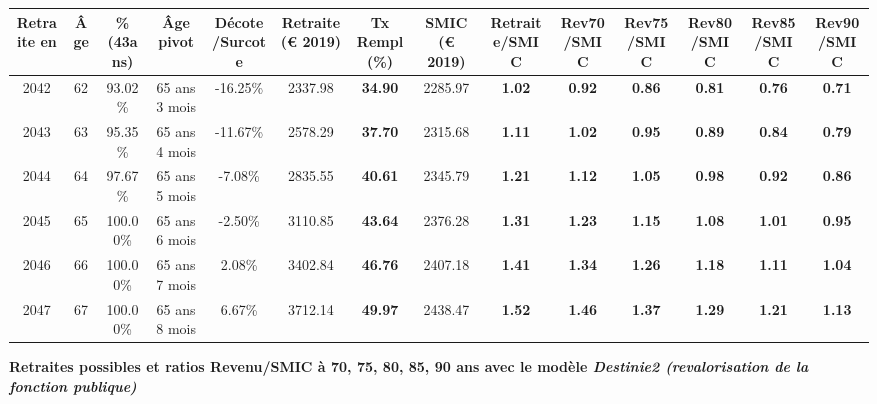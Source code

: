 \begin{adjustbox}{max width=\textwidth} 
\begin{tabular}[htb]{|c|c||c|c|c||c|c||c||c|c|c|c|c|c|} 
\hline 
 Retraite en &  Âge &  \%(43ans) &  Âge pivot &  Décote/Surcote &  Retraite (\euro{} 2019) &  Tx Rempl(\%) &  SMIC (\euro{} 2019) &  Retraite/SMIC &  Rev70/SMIC &  Rev75/SMIC &  Rev80/SMIC &  Rev85/SMIC &  Rev90/SMIC \\ 
\hline \hline 
 2042 &  62 &  93.02\% &  65 ans 3 mois &  -16.25\% &  2337.98 &  {\bf 34.90} &  2285.97 &  {\bf 1.02} &  {\bf {\color{red} 0.92}} &  {\bf {\color{red} 0.86}} &  {\bf {\color{red} 0.81}} &  {\bf {\color{red} 0.76}} &  {\bf {\color{red} 0.71}} \\ 
\hline 
 2043 &  63 &  95.35\% &  65 ans 4 mois &  -11.67\% &  2578.29 &  {\bf 37.70} &  2315.68 &  {\bf 1.11} &  {\bf 1.02} &  {\bf {\color{red} 0.95}} &  {\bf {\color{red} 0.89}} &  {\bf {\color{red} 0.84}} &  {\bf {\color{red} 0.79}} \\ 
\hline 
 2044 &  64 &  97.67\% &  65 ans 5 mois &  -7.08\% &  2835.55 &  {\bf 40.61} &  2345.79 &  {\bf 1.21} &  {\bf 1.12} &  {\bf 1.05} &  {\bf {\color{red} 0.98}} &  {\bf {\color{red} 0.92}} &  {\bf {\color{red} 0.86}} \\ 
\hline 
 2045 &  65 &  100.00\% &  65 ans 6 mois &  -2.50\% &  3110.85 &  {\bf 43.64} &  2376.28 &  {\bf 1.31} &  {\bf 1.23} &  {\bf 1.15} &  {\bf 1.08} &  {\bf 1.01} &  {\bf {\color{red} 0.95}} \\ 
\hline 
 2046 &  66 &  100.00\% &  65 ans 7 mois &  2.08\% &  3402.84 &  {\bf 46.76} &  2407.18 &  {\bf 1.41} &  {\bf 1.34} &  {\bf 1.26} &  {\bf 1.18} &  {\bf 1.11} &  {\bf 1.04} \\ 
\hline 
 2047 &  67 &  100.00\% &  65 ans 8 mois &  6.67\% &  3712.14 &  {\bf 49.97} &  2438.47 &  {\bf 1.52} &  {\bf 1.46} &  {\bf 1.37} &  {\bf 1.29} &  {\bf 1.21} &  {\bf 1.13} \\ 
\hline 
\hline 
\end{tabular} 
\end{adjustbox} 
 
 \vspace{0.1cm} 
{\bf \noindent Retraites possibles et ratios Revenu/SMIC à 70, 75, 80, 85, 90 ans avec le modèle \emph{Destinie2 (revalorisation de la fonction publique)}}  
 
